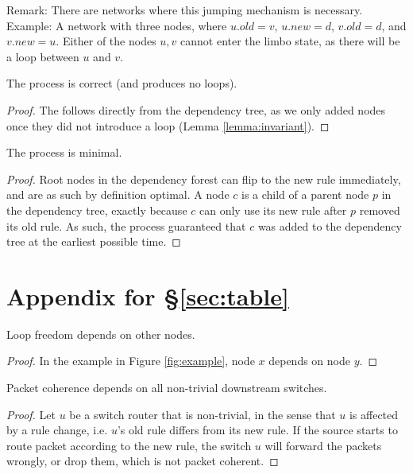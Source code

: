 Remark: There are networks where this jumping mechanism is necessary. Example: A network with three nodes, where $u.old = v$, $u.new = d$, $v.old = d$, and $v.new = u$. Either of the nodes $u,v$ cannot enter the limbo state, as there will be a loop between $u$ and $v$.

\begin{lemma}\label{lemma:correctness} The process is correct (and produces no loops).
\end{lemma}

\begin{proof} The follows directly from the dependency tree, as we only added nodes once they did not introduce a loop (Lemma \ref{lemma:invariant}).
\end{proof}

\begin{lemma}\label{lemma:minimal} The process is minimal.
\end{lemma}

\begin{proof}
Root nodes in the dependency forest can flip to the new rule immediately, and are as such by definition optimal. A node $c$ is a child of a parent node $p$ in the dependency tree, exactly because $c$ can only use its new rule after $p$ removed its old rule. As such, the process guaranteed that $c$ was added to the dependency tree at the earliest possible time.
\end{proof}

\section{Appendix for \S\ref{sec:table}}
\label{sec:app2}


\begin{lemma}\label{lemma:imp loop-free} Loop freedom depends on other nodes.
\end{lemma}

\begin{proof}
In the example in Figure \ref{fig:example}, node $x$ depends on node $y$.
\end{proof}

\begin{lemma}\label{lemma:imp packet coherence} Packet coherence depends on all non-trivial downstream switches.
\end{lemma}

\begin{proof} Let $u$ be a switch router that is non-trivial, in the sense that $u$ is affected by a rule change, i.e. $u$'s old rule differs from its new rule. If the source starts to route packet according to the new rule, the switch $u$ will forward the packets wrongly, or drop them, which is not packet coherent.
\end{proof}

